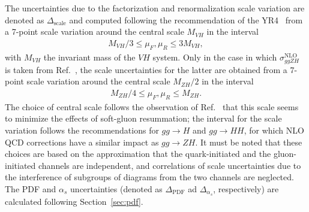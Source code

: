 The uncertainties due to the factorization and renormalization scale variation are denoted as $\Delta_\text{scale}$ and computed following the recommendation of the YR4~\cite{LHCHiggsCrossSectionWorkingGroup:2016ypw} from a 7-point scale variation around the central scale $M_{VH}$ in the interval
\begin{align}
    M_{VH}/3 \leq \mu_F ,\mu_R \leq 3 M_{VH},
\end{align}
with $M_{VH}$ the invariant mass of the $VH$ system. Only in the case in which $\sigma^\mathrm{NLO}_{ggZH}$ is taken from Ref.~\cite{CampilloAveleira:2025rbh}, the scale uncertainties for the latter are obtained from a 7-point scale variation around the central scale $M_{ZH}/2$ in the interval
\begin{align}
    M_{ZH}/4 \leq \mu_F ,\mu_R \leq M_{ZH}.
\end{align}
The choice of central scale follows the observation of
Ref.~\cite{Harlander:2014wda} that this scale seems to minimize the
effects of soft-gluon resummation; the interval for the scale
variation follows the recommendations for $gg\rightarrow H$ and
$gg\rightarrow HH$, for which NLO QCD corrections have a similar
impact as $gg \rightarrow ZH$. It must be noted that these choices are
based on the approximation that the quark-initiated and the
gluon-initiated channels are independent, and correlations of scale
uncertainties due to the interference of subgroups of diagrams from
the two channels are neglected. The PDF and $\alpha_s$ uncertainties
(denoted as $\Delta_\text{PDF}$ ad $\Delta_{\alpha_s}$, respectively)
are calculated following Section~\ref{sec:pdf}.



